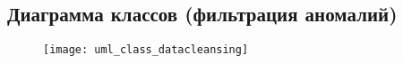 \begin{landscape}
\chapter{Диаграмма классов (фильтрация аномалий)}
\label{app:UML:Class:DataCleansing}
\begin{figure}[H]
\texttt{[image: uml\_class\_datacleansing]}
\end{figure}
\end{landscape}